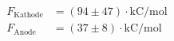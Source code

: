 \begin{align*}
F_\text{Kathode} &= (94 \pm 47)\cdot \text{kC/mol} \\
F_\text{Anode} &= (37 \pm 8)\cdot \text{kC/mol} \\
\end{align*}
